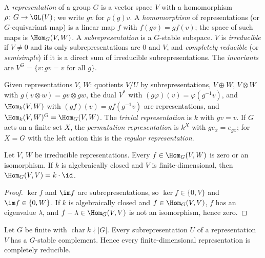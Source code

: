 \begin{definition}\label{representation-theory:definition-representation}
A \emph{representation} of a group $G$ is a vector space $V$ with a homomorphism
$\rho \colon G \to \GL(V)$; we write $gv$ for $\rho(g)v$. A \emph{homomorphism} of representations (or
$G$-equivariant map) is a linear map $f$ with $f(gv) = gf(v)$; the space of such maps is $\Hom_G(V, W)$. A
\emph{subrepresentation} is a $G$-stable subspace. $V$ is \emph{irreducible} if $V \neq 0$ and its only
subrepresentations are $0$ and $V$, and \emph{completely reducible} (or \emph{semisimple}) if it is a direct
sum of irreducible subrepresentations. The \emph{invariants} are $V^G = \{v : gv = v \text{ for all } g\}$.
\end{definition}

\begin{example}\label{representation-theory:example-constructions}
Given representations $V$, $W$: quotients $V/U$ by subrepresentations, $V \oplus W$, $V \otimes W$ with
$g(v \otimes w) = gv \otimes gw$, the dual $V^*$ with $(g\varphi)(v) = \varphi(g^{-1}v)$, and $\Hom_k(V, W)$ with
$(gf)(v) = g f(g^{-1}v)$ are representations, and $\Hom_k(V, W)^G = \Hom_G(V, W)$. The \emph{trivial
representation} is $k$ with $gv = v$. If $G$ acts on a finite set $X$, the \emph{permutation representation} is
$k^X$ with $g e_x = e_{gx}$; for $X = G$ with the left action this is the \emph{regular representation}.
\end{example}

\begin{lemma}[Schur]\label{representation-theory:lemma-schur}
Let $V$, $W$ be irreducible representations. Every $f \in \Hom_G(V, W)$ is zero or an isomorphism. If $k$ is
algebraically closed and $V$ is finite-dimensional, then $\Hom_G(V, V) = k \cdot \id$.
\end{lemma}

\begin{proof}
$\ker f$ and $\im f$ are subrepresentations, so $\ker f \in \{0, V\}$ and $\im f \in \{0, W\}$. If $k$ is algebraically
closed and $f \in \Hom_G(V, V)$, $f$ has an eigenvalue $\lambda$, and $f - \lambda \in \Hom_G(V, V)$ is not an isomorphism,
hence zero.
\end{proof}

\begin{theorem}[Maschke]\label{representation-theory:theorem-maschke}
Let $G$ be finite with $\operatorname{char} k \nmid |G|$. Every subrepresentation $U$ of a representation $V$ has a
$G$-stable complement. Hence every finite-dimensional representation is completely reducible.
\end{theorem}

